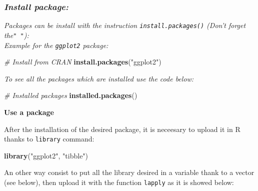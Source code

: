 \documentclass[
]{article}
\newenvironment{Shaded}{\begin{snugshade}}{\end{snugshade}}
\newcommand{\CommentTok}[1]{\textcolor[rgb]{0.56,0.35,0.01}{\textit{#1}}}
\newcommand{\FunctionTok}[1]{\textcolor[rgb]{0.13,0.29,0.53}{\textbf{#1}}}
\newcommand{\NormalTok}[1]{#1}
\newcommand{\StringTok}[1]{\textcolor[rgb]{0.31,0.60,0.02}{#1}}
\begin{document}
\hypertarget{install-package}{%
\subsubsection{\texorpdfstring{\emph{Install
package:}}{Install package:}}\label{install-package}}

\emph{Packages can be install with the instruction
\texttt{install.packages()} (Don't forget the\texttt{"\ "}):\\
Example for the \texttt{ggplot2} package:}

\begin{Shaded}
\begin{Highlighting}[]
\CommentTok{\# Install from CRAN}
\FunctionTok{install.packages}\NormalTok{(}\StringTok{"ggplot2"}\NormalTok{)}
\end{Highlighting}
\end{Shaded}

\emph{To see all the packages which are installed use the code below:}

\begin{Shaded}
\begin{Highlighting}[]
\CommentTok{\# Installed packages}
\FunctionTok{installed.packages}\NormalTok{()}
\end{Highlighting}
\end{Shaded}

\textbf{Use a package}

After the installation of the desired package, it is neceesary to upload
it in R thanks to \texttt{library} command:

\begin{Shaded}
\begin{Highlighting}[]
\FunctionTok{library}\NormalTok{(}\StringTok{"ggplot2"}\NormalTok{, }\StringTok{"tibble"}\NormalTok{)}
\end{Highlighting}
\end{Shaded}

An other way consist to put all the library desired in a variable thank
to a vector (see below), then upload it with the function
\texttt{lapply} as it is showed below:
\end{document}
